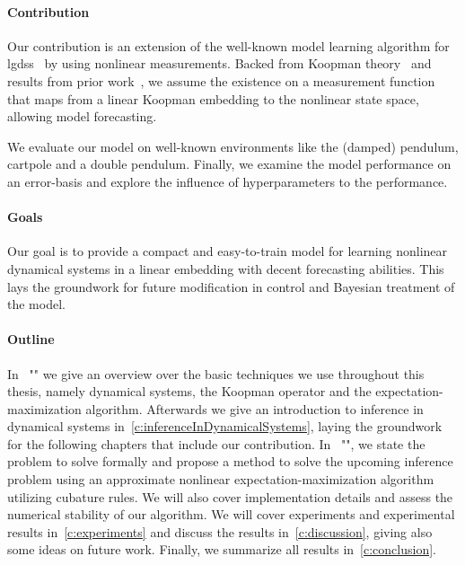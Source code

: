 \paragraph{Contribution}
	Our contribution is an extension of the well-known model learning algorithm for \acp{lgds}~\cite{ghahramaniParameterEstimationLinear1996,minkaHiddenMarkovModels1999} by using nonlinear measurements. Backed from Koopman theory~\cite{koopmanHamiltonianSystemsTransformation1931} and results from prior work~\cite{luschDeepLearningUniversal2018}, we assume the existence on a measurement function that maps from a linear Koopman embedding to the nonlinear state space, allowing model forecasting.

	We evaluate our model on well-known environments like the (damped) pendulum, cartpole and a double pendulum. Finally, we examine the model performance on an error-basis and explore the influence of hyperparameters to the performance.

\paragraph{Goals}
	Our goal is to provide a compact and easy-to-train model for learning nonlinear dynamical systems in a linear embedding with decent forecasting abilities. This lays the groundwork for future modification in control and Bayesian treatment of the model.

\paragraph{Outline}
	In \chapterautorefname~"" we give an overview over the basic techniques we use throughout this thesis, namely dynamical systems, the Koopman operator and the expectation-maximization algorithm. Afterwards we give an introduction to inference in dynamical systems in~\autoref{c:inferenceInDynamicalSystems}, laying the groundwork for the following chapters that include our contribution. In \chapterautorefname~"", we state the problem to solve formally and propose a method to solve the upcoming inference problem using an approximate nonlinear expectation-maximization algorithm utilizing cubature rules. We will also cover implementation details and assess the numerical stability of our algorithm. We will cover experiments and experimental results in~\autoref{c:experiments} and discuss the results in~\autoref{c:discussion}, giving also some ideas on future work. Finally, we summarize all results in~\autoref{c:conclusion}.
